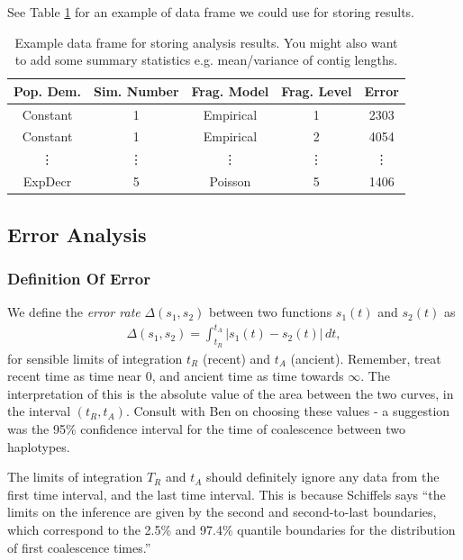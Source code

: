 \documentclass[11pt,a4paper]{article}
\begin{document}
See Table \ref{df} for an example of data frame we could use for storing results.
\begin{table}[h]
	\caption{Example data frame for storing analysis results. You might also want to add some summary statistics e.g. mean/variance of contig lengths.}
	\begin{center}
		\begin{tabular}{ccccc}
			\hline
			\textbf{Pop. Dem.} & \textbf{Sim. Number} & \textbf{Frag. Model} & \textbf{Frag. Level} & \textbf{Error} \\
                        \hline
                        Constant & 1 & Empirical & 1 & 2303 \\
                        Constant & 1 & Empirical & 2 & 4054 \\
                        \vdots & \vdots & \vdots & \vdots & \vdots \\
                        ExpDecr & 5 & Poisson & 5 & 1406 \\ \hline
		\end{tabular}
	\end{center} \label{df}
\end{table}


\subsection{Error Analysis}

\subsubsection{Definition Of Error}
We define the \emph{error rate} $\Delta (s_1,s_2)$ between two functions $s_1(t)$ and $s_2(t)$ as 
\begin{eqnarray}
\Delta (s_1,s_2) = \int_{t_R}^{t_A} |s_1(t)-s_2(t)| \,dt, \label{errorRate}
\end{eqnarray}
for sensible limits of integration $t_R$ (recent) and $t_A$ (ancient). Remember, treat recent time as time near 0, and ancient time as time towards $\infty$. The interpretation of this is the absolute value of the area between the two curves, in the interval $(t_R,t_A)$. Consult with Ben on choosing these values - a suggestion was the 95\% confidence interval for the time of coalescence between two haplotypes.

The limits of integration $T_R$ and $t_A$ should definitely ignore any data from the first time interval, and the last time interval. This is because Schiffels says \cite{schiffels2014inferring} ``the limits on the inference are given by the second and second-to-last boundaries, which correspond to the 2.5\% and 97.4\% quantile boundaries for the distribution of first coalescence times.''
\end{document}
